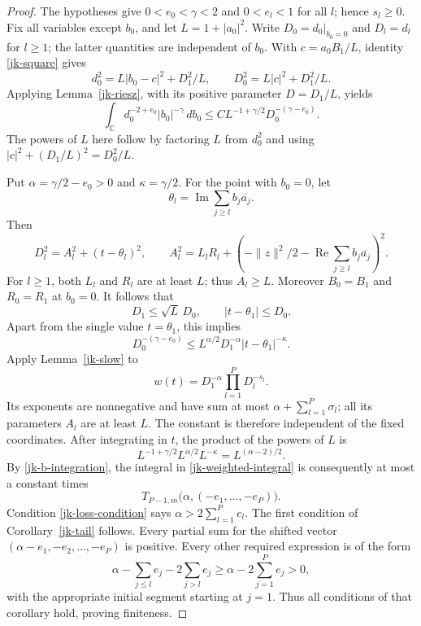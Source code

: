 \begin{proof}
The hypotheses give \(0<e_0<\gamma<2\) and \(0<e_l<1\)
for all \(l\); hence \(s_l\geq0\).
Fix all variables except \(b_0\), and let \(L=1+|a_0|^2\).
Write \(D_0=d_0|_{b_0=0}\) and \(D_l=d_l\) for \(l\geq1\);
the latter quantities are independent of \(b_0\).
With \(c=a_0B_1/L\), identity \eqref{jk-square} gives
\[
 d_0^2=L|b_0-c|^2+D_1^2/L,\qquad
 D_0^2=L|c|^2+D_1^2/L .
\]
Applying Lemma~\ref{jk-riesz}, with its positive parameter
\(D=D_1/L\), yields
\begin{equation}\label{jk-b-integration}
 \int_{\mathbb C}d_0^{-2+e_0}|b_0|^{-\gamma}\,db_0
              \leq C L^{-1+\gamma/2}D_0^{-(\gamma-e_0)}.
\end{equation}
The powers of \(L\) here follow by factoring \(L\) from
\(d_0^2\) and using
\(|c|^2+(D_1/L)^2=D_0^2/L\).

Put \(\alpha=\gamma/2-e_0>0\) and \(\kappa=\gamma/2\).
For the point with \(b_0=0\), let
\[
 \theta_l=\operatorname{Im}\sum_{j\geq l}b_j\overline{a_j}.
\]
Then
\[
 D_l^2=A_l^2+(t-\theta_l)^2,\qquad
 A_l^2=L_lR_l+
       \left(-\|z\|^2/2-
                   \operatorname{Re}\sum_{j\geq l}
                                     b_j\overline{a_j}\right)^2.
\]
For \(l\geq1\), both \(L_l\) and \(R_l\) are at least \(L\);
thus \(A_l\geq L\).
Moreover \(B_0=B_1\) and \(R_0=R_1\) at \(b_0=0\).
It follows that
\[
 D_1\leq\sqrt L\,D_0,\qquad |t-\theta_1|\leq D_0.
\]
Apart from the single value \(t=\theta_1\), this implies
\[
 D_0^{-(\gamma-e_0)}
   \leq L^{\alpha/2}D_1^{-\alpha}|t-\theta_1|^{-\kappa}.
\]
Apply Lemma~\ref{jk-slow} to
\[
 w(t)=D_1^{-\alpha}\prod_{l=1}^{P}D_l^{-s_l}.
\]
Its exponents are nonnegative and have sum at most
\(\alpha+\sum_{l=1}^{P}\sigma_l\); all its parameters
\(A_l\) are at least \(L\).
The constant is therefore independent of the fixed coordinates.
After integrating in \(t\), the product of the powers of \(L\) is
\[
 L^{-1+\gamma/2}L^{\alpha/2}L^{-\kappa}
                                      =L^{(\alpha-2)/2}.
\]
By \eqref{jk-b-integration}, the integral in
\eqref{jk-weighted-integral} is consequently at most a constant
times
\[
 T_{P-1,m}\bigl(\alpha,(-e_1,\ldots,-e_P)\bigr).
\]
Condition \eqref{jk-loss-condition} says
\(\alpha>2\sum_{l=1}^{P}e_l\).
The first condition of Corollary~\ref{jk-tail} follows.
Every partial sum for the shifted vector
\((\alpha-e_1,-e_2,\ldots,-e_P)\) is positive.
Every other required expression is of the form
\[
 \alpha-\sum_{j\leq l}e_j-2\sum_{j>l}e_j
                       \geq\alpha-2\sum_{j=1}^{P}e_j>0,
\]
with the appropriate initial segment starting at \(j=1\).
Thus all conditions of that corollary hold, proving finiteness.
\end{proof}

